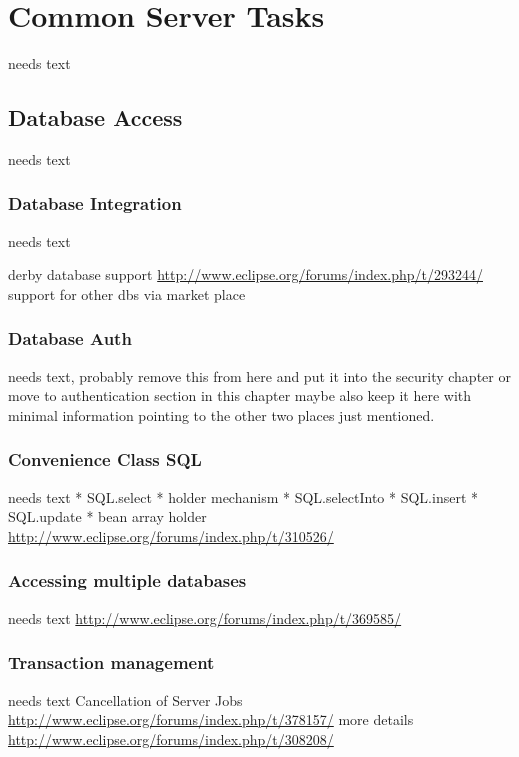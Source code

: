 \documentclass[a4paper,10pt,twoside]{book}
\begin{document}
\chapter{Common Server Tasks}
needs text
  
\section{Database Access}
needs text

\subsection{Database Integration}
needs text

derby database support
\url{http://www.eclipse.org/forums/index.php/t/293244/}
support for other dbs via market place

\subsection{Database Auth}
needs text, probably remove this from here and put it into the security chapter or move to authentication section in this chapter
maybe also keep it here with minimal information pointing to the other two places just mentioned.

\subsection{Convenience Class SQL}
needs text
* SQL.select
* holder mechanism
* SQL.selectInto
* SQL.insert
* SQL.update
* bean array holder \url{http://www.eclipse.org/forums/index.php/t/310526/}

\subsection{Accessing multiple databases}
needs text
\url{http://www.eclipse.org/forums/index.php/t/369585/}

\subsection{Transaction management}
needs text
Cancellation of Server Jobs
\url{http://www.eclipse.org/forums/index.php/t/378157/}
more details \url{http://www.eclipse.org/forums/index.php/t/308208/}
\end{document}
